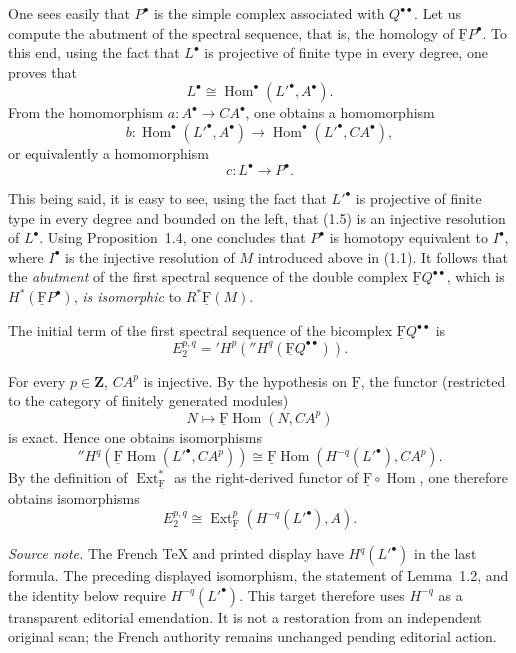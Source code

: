 \documentclass[10pt,a4paper]{article}
\newcommand{\uF}{\underline{\mathrm F}}
\newcommand{\cF}{\uF}
\newcommand{\ZZ}{\mathbf Z}
\theoremstyle{sgatheorem}
\theoremstyle{plain}
\numberwithin{equation}{section}
\begin{document}
One sees easily that $P^\bullet$ is the simple complex associated with
$Q^{\bullet\bullet}$. Let us compute the abutment of the spectral sequence,
that is, the homology of $\uF P^\bullet$. To this end, using the fact that
$L^\bullet$ is projective of finite type in every degree, one proves that
\[
  L^\bullet \cong \operatorname{Hom}^\bullet({L'}^\bullet,A^\bullet).
\]
From the homomorphism $a\colon A^\bullet\to CA^\bullet$, one obtains a
homomorphism
\[
  b\colon \operatorname{Hom}^\bullet({L'}^\bullet,A^\bullet)
  \longrightarrow \operatorname{Hom}^\bullet({L'}^\bullet,CA^\bullet),
\]
or equivalently a homomorphism
\begin{equation}
  c\colon L^\bullet\longrightarrow P^\bullet.
\end{equation}

This being said, it is easy to see, using the fact that ${L'}^\bullet$ is
projective of finite type in every degree and bounded on the left, that
(1.5) is an injective resolution of $L^\bullet$. Using Proposition~1.4, one
concludes that $P^\bullet$ is homotopy equivalent to $I^\bullet$, where
$I^\bullet$ is the injective resolution of $M$ introduced above in (1.1).
It follows that the \emph{abutment} of the first spectral sequence of the
double complex $\uF Q^{\bullet\bullet}$, which is
$H^*(\uF P^\bullet)$, \emph{is isomorphic} to $R^*\uF(M)$.


The initial term of the first spectral sequence of the bicomplex
$\cF Q^{\bullet\bullet}$ is
\[
  E_2^{p,q}
  ={}'\!H^p({}''\!H^q(\cF Q^{\bullet\bullet})).
\]

For every $p\in\ZZ$, $CA^p$ is injective. By the hypothesis on $\cF$, the
functor (restricted to the category of finitely generated modules)
\[
  N\longmapsto \cF\operatorname{Hom}(N,CA^p)
\]
is exact. Hence one obtains isomorphisms
\[
  {}''\!H^q(\cF\operatorname{Hom}({L'}^\bullet,CA^p))
  \cong
  \cF\operatorname{Hom}(H^{-q}({L'}^\bullet),CA^p).
\]
By the definition of $\operatorname{Ext}^{\ast}_{\cF}$ as the right-derived functor
of $\cF\circ\operatorname{Hom}$, one therefore obtains isomorphisms
\[
  E_2^{p,q}
  \cong
  \operatorname{Ext}^{p}_{\cF}(H^{-q}({L'}^\bullet),A).
\]

\noindent\emph{Source note.} The French TeX and printed display have
$H^q({L'}^\bullet)$ in the last formula. The preceding displayed
isomorphism, the statement of Lemma~1.2, and the identity below require
$H^{-q}({L'}^\bullet)$. This target therefore uses $H^{-q}$ as a transparent
editorial emendation. It is not a restoration from an independent original
scan; the French authority remains unchanged pending editorial action.
\end{document}
